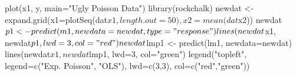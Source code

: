 \begin{Schunk}
\begin{Sinput}
 plot(x1, y, main="Ugly Poisson Data")
 library(rockchalk)
 newdat <- expand.grid(x1=plotSeq(dat$x1, length.out=50), x2=mean(dat$x2))
 newdat$p1 <- predict(m1, newdata=newdat, type="response")
 lines(newdat$x1, newdat$p1, lwd=3, col="red")
 newdat$lmp1 <- predict(lm1, newdata=newdat)
 lines(newdat$x1, newdat$lmp1, lwd=3, col="green")
 legend("topleft", legend=c("Exp. Poisson", "OLS"), lwd=c(3,3), col=c("red","green"))
\end{Sinput}
\end{Schunk}
